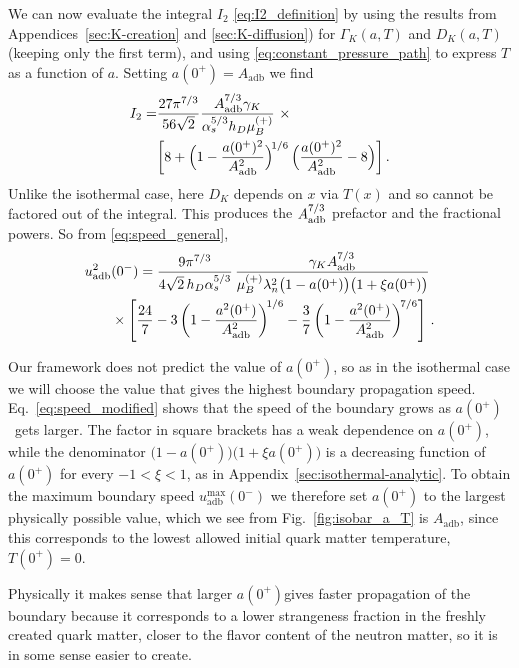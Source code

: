 \documentclass[10pt,superscriptaddress,
amsmath,aps,prc,twocolumn,nofootinbib,floatfix]{revtex4-1}
\newcommand{\mga}[1]{{\color[rgb]{0.6,0,0}#1}}
\newcommand{\al}{\alpha}
\newcommand{\ga}{\gamma}
\newcommand{\Ga}{\Gamma}
\newcommand{\Bratio}{\lambda_n}
\newcommand{\azp}{\ensuremath{a(0^+)}}
\begin{document}
We can now evaluate the integral $I_2$ \eqref{eq:I2_definition} by using the results from
Appendices~\ref{sec:K-creation} and \ref{sec:K-diffusion})
for $\Ga_K(a,T)$ and $D_K(a,T)$ (keeping only the first term), and using \eqref{eq:constant_pressure_path} to express $T$ as a function of $a$. 
\mga{Setting $a(0^+)=A_\text{adb}$} we find
\begin{align}
 I_2 = &\dfrac{27 \pi^{7/3}}{56\sqrt{2}}
 \dfrac{A_{\rm adb}^{7/3}\ga_K}{\al_s^{5/3} h_D \mu_B^{(+)}}\ \times\notag \\
 &\biggl[ 8 + \Bigl(1-\dfrac{a(0^+)^2}{A_{\rm adb}^2}\Bigr)^{\!1/6}\,\Bigl(\dfrac{a(0^+)^2}{A_{\rm adb}^2} - 8\Bigr) \biggr] \,.
\end{align}
\mga{Unlike the isothermal case,
here $D_K$ depends on $x$ via $T(x)$ and so cannot be factored out of the integral. This} produces the $A_{\rm adb}^{7/3}$ prefactor and the fractional powers.
%
So from \eqref{eq:speed_general},
\begin{align}
 u_{\rm adb}^2&(0^-)
 =
 \frac{9\pi^{7/3}}
 {4\sqrt{2}\,h_D\alpha_s^{5/3}}\,
 \frac{\gamma_K A_{\rm adb}^{7/3}}
 {\mu_B^{(+)} \Bratio^2
 \bigl(1-a(0^+)\bigr)\bigl(1+\xi a(0^+)\bigr)}
\notag\\
 &\times
 \left[
 \frac{24}{7}
 -3\left(1-\frac{a^2(0^+)}{A_{\rm adb}^2}\right)^{\!1/6}
 -\frac{3}{7}
 \left(1-\frac{a^2(0^+)}{A_{\rm adb}^2}\right)^{\!7/6}
 \right]\,.
\label{eq:speed_modified}
\end{align}

\mga{Our framework does not predict the value of $\azp$, so as in the isothermal case we will choose the value that gives the highest boundary propagation speed. }
Eq.~\eqref{eq:speed_modified} shows that the speed of the boundary grows as \azp\ gets larger.
The factor in square brackets has a weak dependence on $\azp$, while the denominator $\bigl(1-a(0^+)\bigr)\bigl(1+\xi a(0^+)\bigr)$ is a decreasing function of $\azp$ for every $-1<\xi<1$, as in Appendix~\ref{sec:isothermal-analytic}.
To obtain the maximum boundary speed $u_\text{adb}^\text{max}(0^-)$ we therefore set
$\azp$ to the largest physically possible value, which we  see from Fig.~\ref{fig:isobar_a_T} is $A_\text{adb}$, since this corresponds to the lowest allowed initial quark matter temperature, $T(0^+)=0$.
  
\mga{
Physically it makes sense that larger \azp gives faster propagation of the boundary because it} corresponds to a lower strangeness fraction in the freshly created quark matter, closer to the flavor content of the neutron matter, \mga{so it is in some sense easier to create.}
\end{document}
